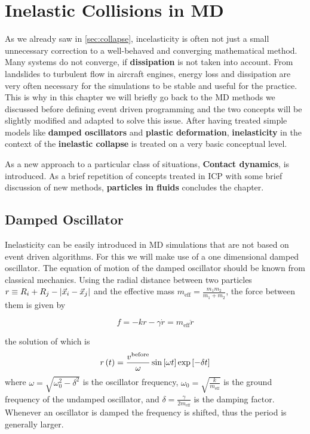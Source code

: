 



\chapter{Inelastic Collisions in MD}


As we already saw in \ref{sec:collapse}, incelasticity is often not just a small unnecessary correction to a well-behaved and converging mathematical method. Many systems do not converge, if \textbf{dissipation} is not taken into account. From landslides to turbulent flow in aircraft engines, energy loss and dissipation are very often necessary for the simulations to be stable and useful for the practice. This is why in this chapter we will briefly go back to the MD methods we discussed before defining event driven programming and the two concepts will be slightly modified and adapted to solve this issue. After having treated simple models like \textbf{damped oscillators} and \textbf{plastic deformation}, \textbf{inelasticity} in the context of the \textbf{inelastic collapse} is treated on a very basic conceptual level. 

As a new approach to a particular class of situations, \textbf{Contact dynamics}, is introduced. As a brief repetition of concepts treated in ICP \citep{comp_phys} with some brief discussion of new methods, \textbf{particles in fluids} concludes the chapter.

\section{Damped Oscillator}
Inelasticity can be easily introduced in MD simulations that are not based on event driven algorithms. For this we will make use of a one dimensional damped oscillator. The equation of motion of the damped oscillator should be known from classical mechanics. Using the radial distance between two particles $r\equiv R_i +R_j -\left|\vec{x}_i-\vec{x}_j\right|$ and the effective mass $m_{\text{eff}} = \frac{m_1m_2}{m_1 + m_2}$, the force between them is given by

\begin{equation}
 f = -kr -\gamma \dot{r}= m_{\text{eff}}\ddot{r}
\end{equation}

\vspace{0.3cm}
\noindent
the solution of which is 
\begin{equation}
r\left(t\right) = \frac{v^{\text{before}}}{\omega} \sin\left[\omega t\right] \exp\left[-\delta t\right]
\end{equation}
where  $\omega = \sqrt{\omega_0^2 - \delta^2}$ is the oscillator frequency, $\omega_0 = \sqrt{\frac{k}{m_{\text{eff}}}}$ is the ground frequency of the undamped oscillator, and $\delta = \frac{\gamma}{2m_{\text{eff}}}$ is the damping factor. Whenever an oscillator is damped the frequency is shifted, thus the period is generally larger.

